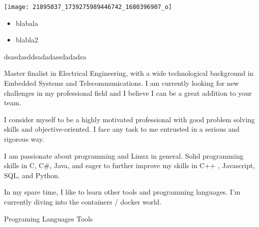 \documentclass[11pt, a4paper]{cv}
\begin{document}

\begin{minipage}{0.3\linewidth}
    \texttt{[image: 21895037\_1739275989446742\_1680396907\_o]}
    \label{fig:joaoprsfragoso}
\end{minipage}\hfil
\begin{minipage}{0.55\linewidth}
\begin{itemize}
	\item blabala
	\item blabla2
\end{itemize}
\end{minipage}


dsasdasddsadadassdadadsa

\aboutme
{

	\faQuoteLeft \space Master finalist in Electrical Engineering, with a wide technological background in Embedded Systems and Telecommunications. I am currently looking for new challenges in my professional field and I believe I can be a great addition to your team.

	I consider myself to be a highly motivated professional with good problem solving skills and objective-oriented. I face any task to me entrusted in a serious and rigorous way.

	I am passionate about programming and Linux in general. Solid programming skills in C, C\#, Java, and eager to further improve my skills in C++ , Javascript, SQL, and Python. 

	In my spare time, I like to learn other tools and programming languages. I'm currently diving into the containers / docker world. \faQuoteRight

}


\lipsum[2]


\begin{multicols}{2}
	Programing Languages \newline
	Tools
\end{multicols}
\end{document}
